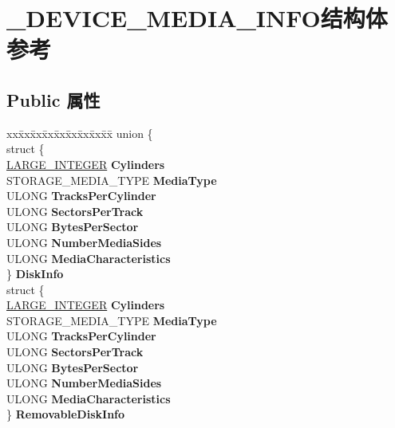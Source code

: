 \hypertarget{struct___d_e_v_i_c_e___m_e_d_i_a___i_n_f_o}{}\section{\+\_\+\+D\+E\+V\+I\+C\+E\+\_\+\+M\+E\+D\+I\+A\+\_\+\+I\+N\+F\+O结构体 参考}
\label{struct___d_e_v_i_c_e___m_e_d_i_a___i_n_f_o}
\subsection*{Public 属性}
\begin{DoxyCompactItemize}
\item 
\mbox{\label{struct___d_e_v_i_c_e___m_e_d_i_a___i_n_f_o_a50ecb5a093985cc53bb5ca93d69a55b4}} 
\begin{tabbing}
xx\=xx\=xx\=xx\=xx\=xx\=xx\=xx\=xx\=\kill
union \{\\
\>struct \{\\
\>\>\hyperlink{union___l_a_r_g_e___i_n_t_e_g_e_r}{LARGE\_INTEGER} {\bfseries Cylinders}\\
\>\>STORAGE\_MEDIA\_TYPE {\bfseries MediaType}\\
\>\>ULONG {\bfseries TracksPerCylinder}\\
\>\>ULONG {\bfseries SectorsPerTrack}\\
\>\>ULONG {\bfseries BytesPerSector}\\
\>\>ULONG {\bfseries NumberMediaSides}\\
\>\>ULONG {\bfseries MediaCharacteristics}\\
\>\} {\bfseries DiskInfo}\\
\>struct \{\\
\>\>\hyperlink{union___l_a_r_g_e___i_n_t_e_g_e_r}{LARGE\_INTEGER} {\bfseries Cylinders}\\
\>\>STORAGE\_MEDIA\_TYPE {\bfseries MediaType}\\
\>\>ULONG {\bfseries TracksPerCylinder}\\
\>\>ULONG {\bfseries SectorsPerTrack}\\
\>\>ULONG {\bfseries BytesPerSector}\\
\>\>ULONG {\bfseries NumberMediaSides}\\
\>\>ULONG {\bfseries MediaCharacteristics}\\
\>\} {\bfseries RemovableDiskInfo}\\

\end{tabbing}
\end{DoxyCompactItemize}
